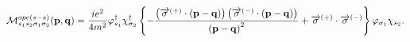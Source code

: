 \begin{equation}
\mathcal{M}_{s_{1}s_{2}\sigma _{1}\sigma _{2}}^{ope\left( s-s\right) }(%
\mathbf{p},\mathbf{q})=\frac{ie^{2}}{4m^{2}}\varphi _{s_{1}}^{\dagger }\chi
_{\sigma _{2}}^{\dagger }\left\{ -\frac{\left( \overrightarrow{\mathbf{%
\sigma }}^{\left( +\right) }\cdot \left( \mathbf{p-q}\right) \right) \left( 
\overrightarrow{\mathbf{\sigma }}^{\left( -\right) }\cdot \left( \mathbf{p-q}%
\right) \right) }{\left( \mathbf{p-q}\right) ^{2}}+\overrightarrow{\mathbf{%
\sigma }}^{\left( +\right) }\cdot \overrightarrow{\mathbf{\sigma }}^{\left(
-\right) }\right\} \varphi _{\sigma _{1}}\chi _{s_{2}}.
\end{equation}

